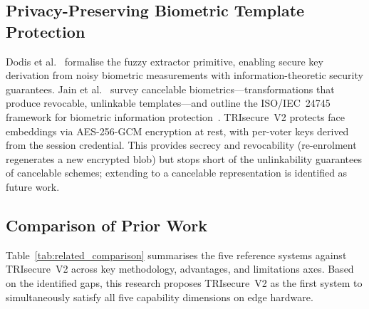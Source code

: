 \documentclass[preprint,12pt]{elsarticle}
\begin{document}
\subsection{Privacy-Preserving Biometric Template Protection}

Dodis et al.~\cite{dodis2004fuzzy} formalise the fuzzy extractor primitive,
enabling secure key derivation from noisy biometric measurements with
information-theoretic security guarantees.
Jain et al.~\cite{jain2008cancelable} survey cancelable biometrics—transformations
that produce revocable, unlinkable templates—and outline the ISO/IEC~24745
framework for biometric information protection~\cite{iso24745}.
TRIsecure~V2 protects face embeddings via AES-256-GCM encryption at rest, with
per-voter keys derived from the session credential. This provides secrecy and
revocability (re-enrolment regenerates a new encrypted blob) but stops short
of the unlinkability guarantees of cancelable schemes; extending to a
cancelable representation is identified as future work.

\subsection{Comparison of Prior Work}
\label{sec:related_comparison}

Table~\ref{tab:related_comparison} summarises the five reference systems
against TRIsecure~V2 across key methodology, advantages, and limitations axes.
Based on the identified gaps, this research proposes TRIsecure~V2 as the
first system to simultaneously satisfy all five capability dimensions on
edge hardware.
\end{document}
